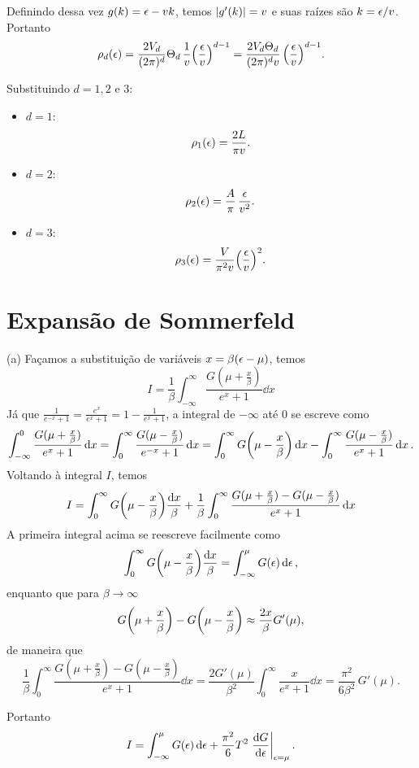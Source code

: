 \documentclass[a4paper,10pt]{article}
\begin{document}
Definindo dessa vez $g(k) = \epsilon - vk$, temos $\abs{g'(k)} = v$ e suas raízes são $k = \epsilon/v$. Portanto
$$
\rho_d(\epsilon) = \frac{2V_d}{(2\pi)^d} \Theta_d \, \frac{1}{v}
\qty(\frac{\epsilon}{v})^{d-1} = \frac{2 V_d \Theta_d}{(2\pi)^d v} \, \qty(\frac{\epsilon}{v})^{d-1}.
$$

Substituindo $d = 1, 2$ e $3$:
\begin{itemize}
\item $d = 1$:
$$
\rho_1(\epsilon) = \frac{2 L}{\pi v}.
$$
\item $d = 2$:
$$
\rho_2(\epsilon) = \frac{A}{\pi} \, \frac{\epsilon}{v^2}.
$$
\item $d = 3$:
$$
\rho_3(\epsilon) = \frac{V}{\pi^2 v} \qty(\frac{\epsilon}{v})^2.
$$
\end{itemize}

\pagebreak

\section{Expansão de Sommerfeld}

(a) Façamos a substituição de variáveis $x = \beta(\epsilon - \mu)$, temos
$$
I = \frac{1}{\beta} \int_{-\infty}^{\infty} \frac{G(\mu + \frac{x}{\beta})}{e^{x} + 1} \dd{x}
$$
Já que $\displaystyle{\frac{1}{e^{-x} + 1} = \frac{e^x}{e^x + 1} = 1 - \frac{1}{e^x + 1}}$, a integral de $-\infty$ até $0$ se escreve como
$$
\int_{-\infty}^0 \frac{G(\mu + \frac{x}{\beta})}{e^{x} + 1} \dd{x} =
\int_0^{\infty} \frac{G(\mu - \frac{x}{\beta})}{e^{-x} + 1} \dd{x} =
\int_0^{\infty} G\qty(\mu - \frac{x}{\beta}) \dd{x} -
\int_0^{\infty} \frac{G(\mu - \frac{x}{\beta})}{e^{x} + 1} \dd{x}.
$$
Voltando à integral $I$, temos
$$
I =
\int_0^{\infty} G\qty(\mu - \frac{x}{\beta}) \frac{\dd{x}}{\beta} +
\frac{1}{\beta}
\int_0^{\infty}\frac{G(\mu + \frac{x}{\beta}) - G(\mu - \frac{x}{\beta})}{e^x + 1}\dd{x}
$$
A primeira integral acima se reescreve facilmente como
$$
\int_0^\infty G\qty(\mu - \frac{x}{\beta}) \frac{\dd{x}}{\beta} =
\int_{-\infty}^\mu G(\epsilon) \dd{\epsilon},
$$
enquanto que para $\beta \to \infty$
$$
G\qty(\mu + \frac{x}{\beta}) - G\qty(\mu - \frac{x}{\beta}) \approx \frac{2x}{\beta} G'(\mu),
$$
de maneira que
$$
\frac{1}{\beta}
\int_0^{\infty}\frac{G(\mu + \frac{x}{\beta}) - G(\mu - \frac{x}{\beta})}{e^x + 1}\dd{x}=
\frac{2 G'(\mu)}{\beta^2}
\int_0^{\infty}\frac{x}{e^x + 1}\dd{x} =
\frac{\pi^2}{6 \beta^2} \, G'(\mu).
$$

Portanto
$$
I = \int_{-\infty}^{\mu} G(\eps) \dd{\eps} + \frac{\pi^2}{6} T^2 \eval{\dv{G}{\eps}}_{\eps = \mu}.
$$
\end{document}
